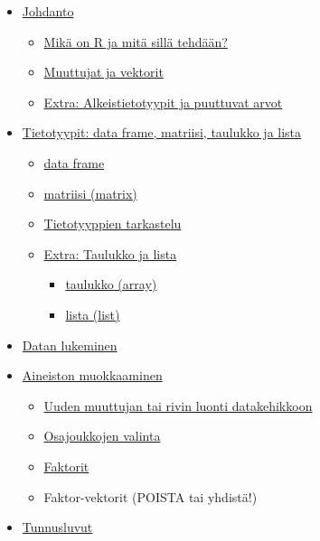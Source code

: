 \documentclass[
]{book}
\providecommand{\tightlist}{%
  \setlength{\itemsep}{0pt}\setlength{\parskip}{0pt}}
\begin{document}
\begin{itemize}
\tightlist
\item
  \protect\hyperlink{intro}{Johdanto}

  \begin{itemize}
  \tightlist
  \item
    \protect\hyperlink{what_R}{Mikä on R ja mitä sillä tehdään?}
  \item
    \protect\hyperlink{variables_and_vectors}{Muuttujat ja vektorit}
  \item
    \protect\hyperlink{extra}{Extra: Alkeistietotyypit ja puuttuvat arvot}
  \end{itemize}
\item
  \protect\hyperlink{data_types}{Tietotyypit: data frame, matriisi, taulukko ja lista}

  \begin{itemize}
  \tightlist
  \item
    \protect\hyperlink{data-frame}{data frame}
  \item
    \protect\hyperlink{matriisi}{matriisi (matrix)}
  \item
    \href{tietotyyppien-tarkastelu}{Tietotyyppien tarkastelu}
  \item
    \protect\hyperlink{taulukot-ja-listat}{Extra: Taulukko ja lista}

    \begin{itemize}
    \tightlist
    \item
      \protect\hyperlink{taulukko}{taulukko (array)}
    \item
      \protect\hyperlink{lista}{lista (list)}
    \end{itemize}
  \end{itemize}
\item
  \protect\hyperlink{reading_data}{Datan lukeminen}
\item
  \protect\hyperlink{data-wrangling}{Aineiston muokkaaminen}

  \begin{itemize}
  \tightlist
  \item
    \protect\hyperlink{data-frame-wrangling}{Uuden muuttujan tai rivin luonti datakehikkoon}
  \item
    \protect\hyperlink{osajoukkojen-valinta}{Osajoukkojen valinta}
  \item
    \protect\hyperlink{faktorit}{Faktorit}
  \item
    Faktor-vektorit (POISTA tai yhdistä!)
  \end{itemize}
\item
  \protect\hyperlink{statistics}{Tunnusluvut}


\end{itemize}
\end{document}
